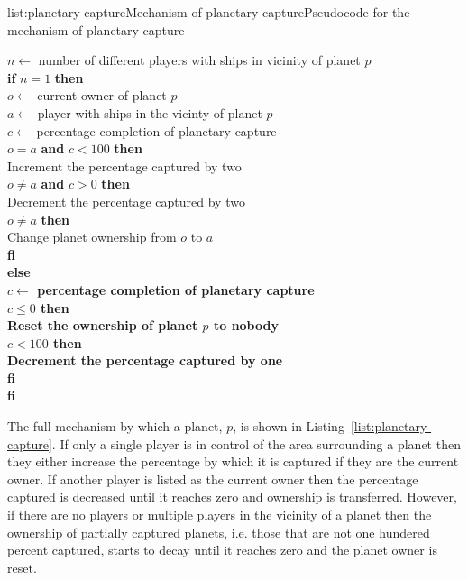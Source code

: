 \vspace{-0.5em}
\begin{listing}{list:planetary-capture}{Mechanism of planetary capture}{Pseudocode for the mechanism of planetary capture}{}
\end{listing}\vspace{-1.5em}

\begin{tabbing}
$n \leftarrow$ number of different players with ships in vicinity of planet $p$ \\
{\bf if} $n = 1$ {\bf then} \\
\quad $o \leftarrow$ current owner of planet $p$ \\
\quad $a \leftarrow$ player with ships in the vicinty of planet $p$ \\
\quad $c \leftarrow$ percentage completion of planetary capture \\
 $o = a$ {\bf and} $c < 100$ {\bf then} \\
\quad\quad Increment the percentage captured by two \\
 $o \neq a$ {\bf and} $c > 0$ {\bf then} \\
\quad\quad Decrement the percentage captured by two \\
 $o \neq a$ {\bf then} \\
\quad\quad Change planet ownership from $o$ to $a$ \\
\quad\bf fi \\
\bf else \\
\quad $c \leftarrow$ percentage completion of planetary capture \\
 $c \leq 0$ {\bf then} \\
\quad\quad Reset the ownership of planet $p$ to nobody \\
 $c < 100$ {\bf then} \\
\quad\quad Decrement the percentage captured by one \\
\quad\bf fi \\
\bf fi
\end{tabbing}
\noindent
The full mechanism by which a planet, $p$, is shown in Listing~\ref{list:planetary-capture}.
If only a single player is in control of the area surrounding a planet then they either
increase the percentage by which it is captured if they are the current owner. If another
player is listed as the current owner then the percentage captured is decreased until it
reaches zero and ownership is transferred. However, if there are no players or multiple
players in the vicinity of a planet then the ownership of partially captured planets,
i.e. those that are not one hundered percent captured, starts to decay until it reaches
zero and the planet owner is reset.
